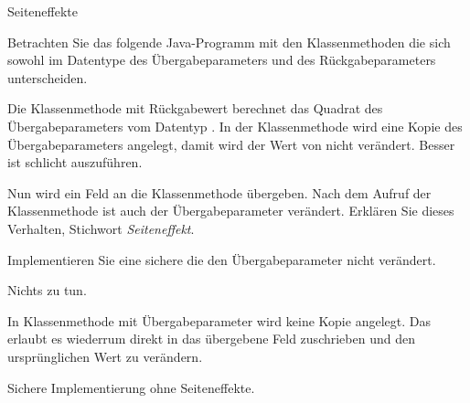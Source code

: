 \begin{exercise}{Seiteneffekte}
\begin{body}
Betrachten Sie das folgende Java-Programm mit den Klassenmethoden  die sich sowohl im Datentype des \"Ubergabeparameters und des R\"uckgabeparameters unterscheiden.


\begin{parts}
\item Die Klassenmethode  mit R\"uckgabewert  berechnet das Quadrat des \"Ubergabeparameters vom Datentyp .
In der Klassenmethode wird eine Kopie des \"Ubergabeparameters angelegt, damit wird der Wert von  nicht ver\"andert.
Besser ist schlicht  auszuf\"uhren.
\item Nun wird ein Feld an die Klassenmethode  \"ubergeben.
Nach dem Aufruf der Klassenmethode ist auch der \"Ubergabeparameter ver\"andert.
Erkl\"aren Sie dieses Verhalten, Stichwort \emph{Seiteneffekt}.
\item Implementieren Sie eine sichere  die den \"Ubergabeparameter nicht ver\"andert.
\end{parts}
\end{body}

\begin{solution}
\begin{parts}
\item Nichts zu tun.
\item In Klassenmethode  mit \"Ubergabeparameter  wird keine Kopie angelegt.
Das erlaubt es wiederrum direkt in das \"ubergebene Feld  zuschrieben und den urspr\"unglichen Wert zu ver\"andern.
\item Sichere Implementierung ohne Seiteneffekte.
\end{parts}
\end{solution}
\end{exercise}
